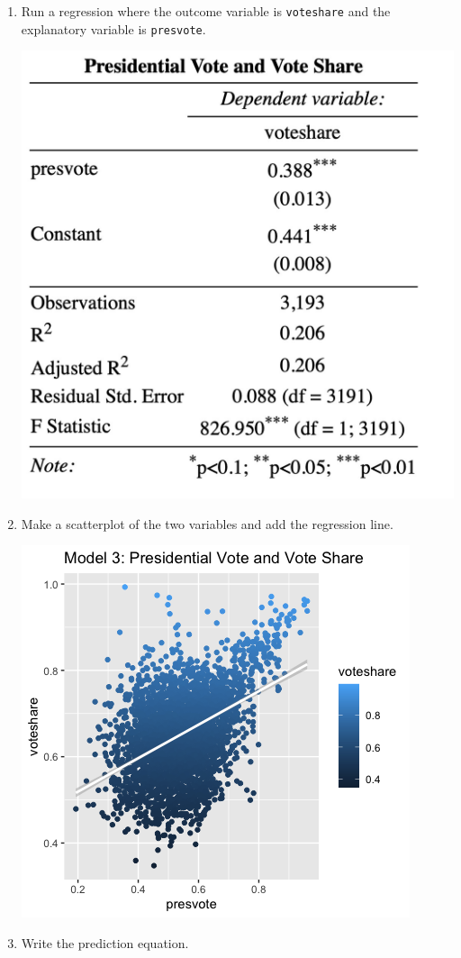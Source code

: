 \documentclass[12pt,letterpaper]{article}
\begin{document}
	\begin{enumerate}
		\item Run a regression where the outcome variable is \texttt{voteshare} and the explanatory variable is \texttt{presvote}.
					 
		\includegraphics[width=.8\textwidth]{model_3.jpg}
			\vspace{5cm}
		\item Make a scatterplot of the two variables and add the regression line. 
			\vspace{.5cm}
		
		 
		\centering
		\includegraphics[width=.8\textwidth]{plot3.png}
			\vspace{.5cm}
		\item Write the prediction equation.
			 
	\end{enumerate}
	
\end{document}

